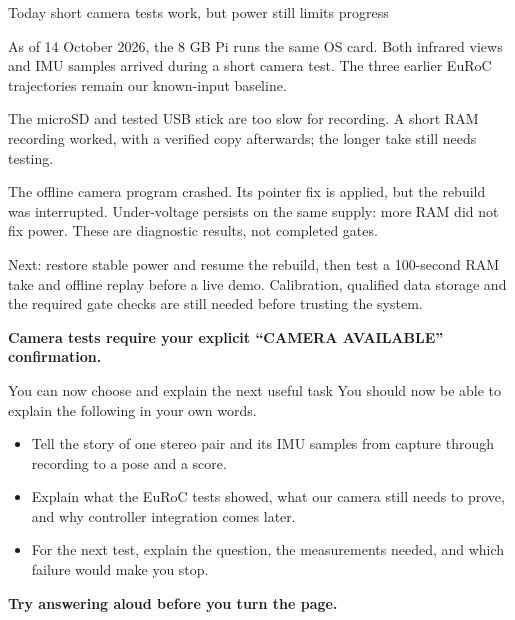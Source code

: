 \documentclass[aspectratio=169,12pt,t]{beamer}
\newcommand{\para}[1]{#1\par\medskip}
\newcommand{\lesson}[1]{\vfill{\color{teal!70!black}\bfseries #1}\par}
\begin{document}
\begin{frame}{Today short camera tests work, but power still limits progress}

\para{As of 14 October 2026, the 8 GB Pi runs the same OS card. Both infrared views and IMU samples arrived during a short camera test. The three earlier EuRoC trajectories remain our known-input baseline.}
\para{The microSD and tested USB stick are too slow for recording. A short RAM recording worked, with a verified copy afterwards; the longer take still needs testing.}
\para{The offline camera program crashed. Its pointer fix is applied, but the rebuild was interrupted. Under-voltage persists on the same supply: more RAM did not fix power. These are diagnostic results, not completed gates.}
\para{Next: restore stable power and resume the rebuild, then test a 100-second RAM take and offline replay before a live demo. Calibration, qualified data storage and the required gate checks are still needed before trusting the system.}
\lesson{Camera tests require your explicit ``CAMERA AVAILABLE'' confirmation.}

\end{frame}

\begin{frame}{You can now choose and explain the next useful task}
\para{You should now be able to explain the following in your own words.}
\begin{itemize}
\item Tell the story of one stereo pair and its IMU samples from capture through recording to a pose and a score.
\item Explain what the EuRoC tests showed, what our camera still needs to prove, and why controller integration comes later.
\item For the next test, explain the question, the measurements needed, and which failure would make you stop.
\end{itemize}
\lesson{Try answering aloud before you turn the page.}
\end{frame}
\end{document}
